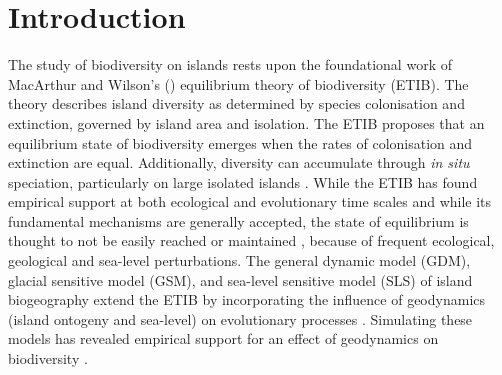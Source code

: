 \documentclass{article}
\begin{document}
\clearpage

\section*{Introduction}

The study of biodiversity on islands rests upon the foundational work of MacArthur and Wilson’s (\citeyear{macarthur_equilibrium_1963, macarthur_theory_1967}) equilibrium theory of biodiversity (ETIB). The theory describes island diversity as determined by species colonisation and extinction, governed by island area and isolation. The ETIB proposes that an equilibrium state of biodiversity emerges when the rates of colonisation and extinction are equal. Additionally, diversity can accumulate through \textit{in situ} speciation, particularly on large isolated islands \citep{macarthur_theory_1967, losos_analysis_2000, rosindell_unified_2011, valente_simple_2020}. While the ETIB has found empirical support at both ecological \citep{simberloff_experimental_1970} and evolutionary \citep{valente_equilibrium_2017, valente_simple_2020} time scales and while its fundamental mechanisms are generally accepted, the state of equilibrium is thought to not be easily reached or maintained \citep{heaney_dynamic_2000, whittaker_general_2008, valente_effects_2014, warren_islands_2015, fernandezpalacios_towards_2016, marshall_uncertain_2016}, because of frequent ecological, geological and sea-level perturbations. The general dynamic model (GDM), glacial sensitive model (GSM), and sea-level sensitive model (SLS) of island biogeography extend the ETIB by incorporating the influence of geodynamics (island ontogeny and sea-level) on evolutionary processes \citep{whittaker_general_2008, fernandezpalacios_towards_2016, avila_towards_2019}. Simulating these models has revealed empirical support for an effect of geodynamics on biodiversity \citep{whittaker_general_2008, bunnefeld_island_2012, steinbauer_re-evaluating_2013, rijsdijk_quantifying_2014, lim_true_2017}. \\
\end{document}
